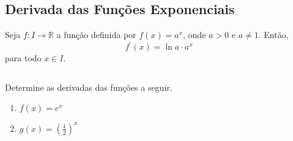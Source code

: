 \subsection{Derivada das Funções Exponenciais}
\begin{frame}
  \begin{theorem}
    Seja $f:I\rightarrow\mathbb{R}$ a função definida por $f(x) = a^{x}$, onde $a>0$ e $a\neq 1$. Então, 
    \begin{equation*}
      f^{\prime}(x) = \ln{a}\cdot a^{x}
    \end{equation*}
    para todo $x\in I$.
  \end{theorem}
  \begin{columns}[onlytextwidth]
    \begin{column}{0.55\textwidth}
      \begin{example-highlight}
        Determine as derivadas das funções a seguir.
        \begin{enumerate}
          \item $f(x) = e^{x}$
          \item $\displaystyle g(x) = \left(\frac{1}{2}\right)^{x}$
        \end{enumerate}
      \end{example-highlight}
    \end{column}
    \begin{column}{0.43\textwidth}\vspace{-0.6cm}
    \end{column}
  \end{columns}
\end{frame}
